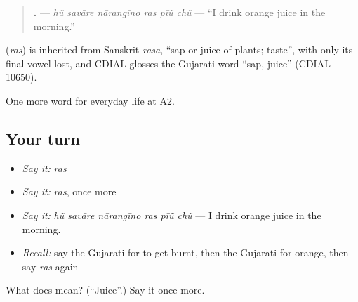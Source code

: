 \begin{quote}
\textbf{     .} — \emph{hũ savāre nārangīno ras pīũ chũ} — \textquotedblleft{}I drink orange juice in the morning.\textquotedblright{}
\end{quote}

\begin{cousinweb}
\textbf{} (\emph{ras}) is inherited from Sanskrit \emph{rasa}, \textquotedblleft{}sap or juice of plants; taste\textquotedblright{}, with only its final vowel lost, and CDIAL glosses the Gujarati word \textquotedblleft{}sap, juice\textquotedblright{} (CDIAL 10650).
\end{cousinweb}

\begin{grammarlens}[title={What you've built}]
One more word for everyday life at A2.
\end{grammarlens}

\subsection*{Your turn}
\begin{itemize}
\raggedright
  \item \emph{Say it:} \emph{ras}
  \item \emph{Say it:} \emph{ras}, once more
  \item \emph{Say it:} \emph{hũ savāre nārangīno ras pīũ chũ} — I drink orange juice in the morning.
  \item \emph{Recall:} say the Gujarati for to get burnt, then the Gujarati for orange, then say \emph{ras} again
\end{itemize}

\begin{tcolorbox}[breakable,colback=teal!4,colframe=teal!35!black,title={Before you move on}]
What does  mean? (\textquotedblleft{}Juice\textquotedblright{}.) Say it once more.
\end{tcolorbox}
